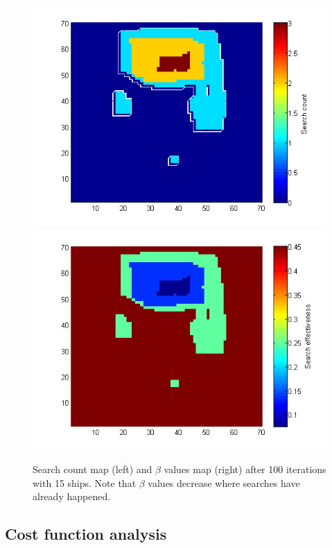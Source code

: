 \documentclass[a4paper]{article}
\begin{document}
\begin{figure}[H]\begin{center}
\includegraphics[scale=0.5]{../Matlab/Images/After100SearchCount.png}
\includegraphics[scale=0.5]{../Matlab/Images/After100SearchEffectiveness.png}
\caption{Search count map (left) and $\beta$ values map (right) after 100 iterations with 15 ships. Note that $\beta$ values decrease where searches have already happened.}
\end{center}\end{figure}

\subsection{Cost function analysis}
\end{document}
